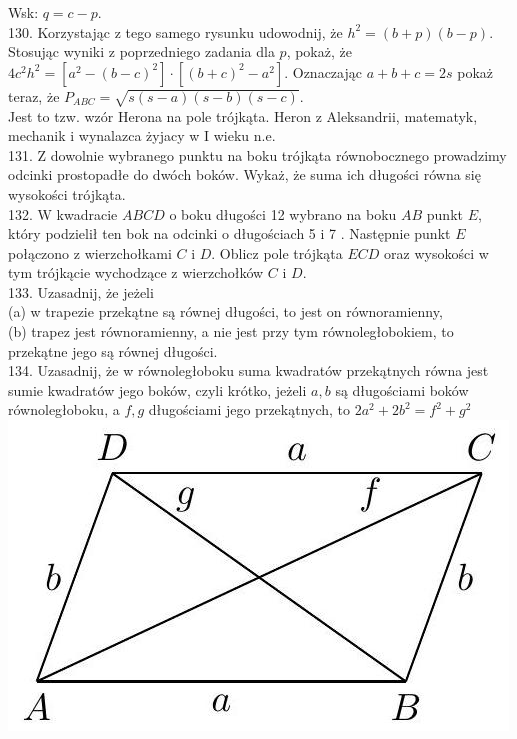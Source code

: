 \documentclass[10pt]{article}
\begin{document}
Wsk: \(q=c-p\).\\
130. Korzystając z tego samego rysunku udowodnij, że \(h^{2}=(b+p)(b-p)\). Stosując wyniki z poprzedniego zadania dla \(p\), pokaż, że \(4 c^{2} h^{2}=\left[a^{2}-(b-c)^{2}\right] \cdot\left[(b+c)^{2}-a^{2}\right]\). Oznaczając \(a+b+c=2 s\) pokaż teraz, że \(P_{A B C}=\sqrt{s(s-a)(s-b)(s-c)}\).\\
Jest to tzw. wzór Herona na pole trójkąta. Heron z Aleksandrii, matematyk, mechanik i wynalazca żyjacy w I wieku n.e.\\
131. Z dowolnie wybranego punktu na boku trójkąta równobocznego prowadzimy odcinki prostopadłe do dwóch boków. Wykaż, że suma ich długości równa się wysokości trójkąta.\\
132. W kwadracie \(A B C D\) o boku długości 12 wybrano na boku \(A B\) punkt \(E\), który podzielił ten bok na odcinki o długościach 5 i 7 . Następnie punkt \(E\) połączono z wierzchołkami \(C\) i \(D\). Oblicz pole trójkąta \(E C D\) oraz wysokości w tym trójkącie wychodzące z wierzchołków \(C\) i \(D\).\\
133. Uzasadnij, że jeżeli\\
(a) w trapezie przekątne są równej długości, to jest on równoramienny,\\
(b) trapez jest równoramienny, a nie jest przy tym równoległobokiem, to przekątne jego są równej długości.\\
134. Uzasadnij, że w równoległoboku suma kwadratów przekątnych równa jest sumie kwadratów jego boków, czyli krótko, jeżeli \(a, b\) są długościami boków równoległoboku, a \(f, g\) długościami jego przekątnych, to \(2 a^{2}+2 b^{2}=f^{2}+g^{2}\)\\
\includegraphics[max width=\textwidth, center]{2024_11_21_71f62bd117d375398909g-145(1)}
\end{document}
